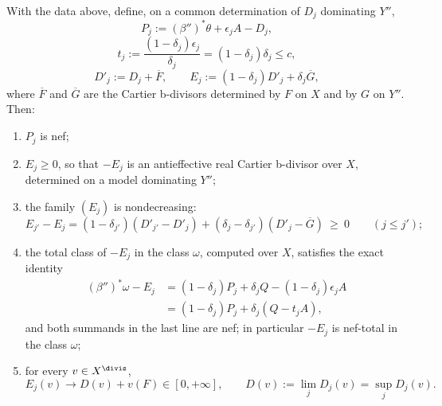 \begin{lemma}
\label{lem:ch39-interpolation}
With the data above, define, on a common determination of $D_j$
dominating $Y''$,
\[
 P_j:=(\beta'')^*\theta+\epsilon_jA-D_j,
\tag{39.10}\label{eq:bj-reflection-Pi}
\]
\[
 t_j:=\frac{(1-\delta_j)\epsilon_j}{\delta_j}=(1-\delta_j)\delta_j\le c,
\tag{39.11}\label{eq:bj-reflection-delta}
\]
\[
 D'_j:=D_j+\overline F,
 \qquad
 E_j:=(1-\delta_j)D'_j+\delta_j\overline G ,
\tag{39.12}\label{eq:bj-reflection-Ei}
\]
where $\overline F$ and $\overline G$ are the Cartier b-divisors
determined by $F$ on $X$ and by $G$ on $Y''$.  Then:
\begin{enumerate}
\item\label{itm:ch39-int:nefP} $P_j$ is nef;
\item\label{itm:ch39-int:pos} $E_j\ge0$, so that $-E_j$ is an
 antieffective real Cartier b-divisor over $X$, determined on a model
 dominating $Y''$;
\item\label{itm:ch39-int:order} the family $(E_j)$ is nondecreasing:
\[
 E_{j'}-E_j
 =(1-\delta_{j'})(D'_{j'}-D'_j)
  +(\delta_j-\delta_{j'})(D'_j-\overline G)\ \ge\ 0
 \qquad(j\le j');
\tag{39.13}\label{eq:bj-reflection-Ei-order}
\]
\item\label{itm:ch39-int:total} the total class of $-E_j$ in the class
 $\omega$, computed over $X$, satisfies the exact identity
\[
 \begin{aligned}
 (\beta'')^*\omega-E_j
  &=(1-\delta_j)P_j+\delta_jQ-(1-\delta_j)\epsilon_jA\\
  &=(1-\delta_j)P_j+\delta_j(Q-t_jA),
 \end{aligned}
\tag{39.14}\label{eq:bj-reflection-total}
\]
and both summands in the last line are nef; in particular $-E_j$ is
nef-total in the class $\omega$;
\item\label{itm:ch39-int:limit} for every $v\in X^{\divis}$,
\[
 E_j(v)\longrightarrow D(v)+v(F)\in[0,+\infty],
 \qquad
 D(v):=\lim_jD_j(v)=\sup_jD_j(v).
\tag{39.15}\label{eq:bj-reflection-Ei-limit}
\]
\end{enumerate}
\end{lemma}

